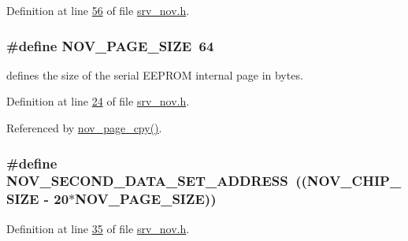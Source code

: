 Definition at line \hyperlink{a00029_source_l00056}{56} of file \hyperlink{a00029_source}{srv\+\_\+nov.\+h}.

\hypertarget{a00029_aad44ced0f63ecf5d2ced5bc0bf220287}{
\subsubsection[{N\+O\+V\+\_\+\+P\+A\+G\+E\+\_\+\+S\+I\+Z\+E}]{\setlength{\rightskip}{0pt plus 5cm}\#define N\+O\+V\+\_\+\+P\+A\+G\+E\+\_\+\+S\+I\+Z\+E~64}}\label{a00029_aad44ced0f63ecf5d2ced5bc0bf220287}


defines the size of the serial E\+E\+P\+R\+O\+M internal page in bytes. 



Definition at line \hyperlink{a00029_source_l00024}{24} of file \hyperlink{a00029_source}{srv\+\_\+nov.\+h}.



Referenced by \hyperlink{a00060_source_l00663}{nov\+\_\+page\+\_\+cpy()}.

\hypertarget{a00029_ab062741a69ee7156fbdf317ec627b4ca}{
\subsubsection[{N\+O\+V\+\_\+\+S\+E\+C\+O\+N\+D\+\_\+\+D\+A\+T\+A\+\_\+\+S\+E\+T\+\_\+\+A\+D\+D\+R\+E\+S\+S}]{\setlength{\rightskip}{0pt plus 5cm}\#define N\+O\+V\+\_\+\+S\+E\+C\+O\+N\+D\+\_\+\+D\+A\+T\+A\+\_\+\+S\+E\+T\+\_\+\+A\+D\+D\+R\+E\+S\+S~(({\bf N\+O\+V\+\_\+\+C\+H\+I\+P\+\_\+\+S\+I\+Z\+E} -\/ 20$\ast${\bf N\+O\+V\+\_\+\+P\+A\+G\+E\+\_\+\+S\+I\+Z\+E}))}}\label{a00029_ab062741a69ee7156fbdf317ec627b4ca}


Definition at line \hyperlink{a00029_source_l00035}{35} of file \hyperlink{a00029_source}{srv\+\_\+nov.\+h}.



